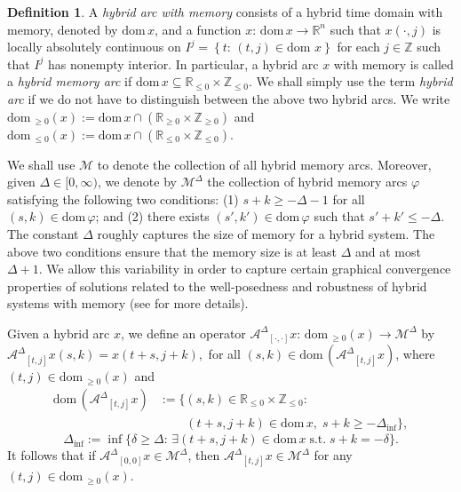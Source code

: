 \documentclass[journal,final,twocolumn]{IEEEtran}
\theoremstyle{definition}
\newtheorem{defn}{Definition}
\begin{document}
\begin{defn}
A \emph{hybrid arc with memory} consists of a hybrid time domain with memory, denoted by ${\text{dom}\,} x$, and a function $x:\,{\text{dom}\,} x{\rightarrow} {\mathbb R}^n$ such that $x(\cdot,j)$ is locally absolutely continuous on $I^{j}={\left\{{t:\,(t,j)\in{\text{dom}\,}\,x}\right\}}$ for each $j\in{\mathbb{Z}}$ such that $I^{j}$ has nonempty interior. In particular, a hybrid arc $x$ with memory is called a \emph{hybrid memory arc} if ${\text{dom}\,} x{\subseteq}{\mathbb R}_{\le 0}\times{\mathbb{Z}}_{\le 0}$. We shall simply use the term \emph{hybrid arc} if we do not have to distinguish between the above two hybrid arcs. We write ${\text{dom}\,}_{\ge 0}(x):={\text{dom}\,} x\cap({\mathbb R}_{\ge 0}\times {\mathbb{Z}}_{\ge 0})$ and  ${\text{dom}\,}_{\le 0}(x):={\text{dom}\,} x\cap({\mathbb R}_{\le 0}\times {\mathbb{Z}}_{\le 0})$.
\end{defn}

We shall use ${\mathcal{M}}$ to denote the collection of all hybrid memory arcs. Moreover, given $\Delta\in[0,\infty)$, we denote by ${\mathcal{M}^{\Delta}}$ the collection of hybrid memory arcs ${\varphi}$ satisfying the following two conditions: (1) $s+k\ge -\Delta-1$ for all $(s,k)\in{\text{dom}\,}{\varphi}$; and (2) there exists $(s',k')\in {\text{dom}\,}{\varphi}$ such that $s'+k'\le-\Delta$. The constant $\Delta$ roughly captures the size of memory for a hybrid system. The above two conditions ensure that the memory size is at least $\Delta$ and at most $\Delta+1$. We allow this variability in order to capture certain graphical convergence properties of solutions related to the well-posedness and robustness of hybrid systems with memory (see \cite{liu2014hybrid-siam} for more details). 

Given a hybrid arc $x$, we define an operator ${\mathcal{A}^{\Delta}}_{[\cdot,\cdot]}x:\,{\text{dom}\,}_{\ge 0}(x){\rightarrow} {\mathcal{M}^{\Delta}}$ by
$
{\mathcal{A}^{\Delta}}_{[t,j]}x(s,k)=x(t+s,j+k),
$
for all $(s,k)\in{\text{dom}\,} ({\mathcal{A}^{\Delta}}_{[t,j]}x)$, where $(t,j)\in{\text{dom}\,}_{\ge 0}(x)$ and
\begin{align*}
{\text{dom}\,} ({\mathcal{A}^{\Delta}}_{[t,j]} x)&:=\Big\{(s,k)\in {\mathbb R}_{\le 0}\times {\mathbb{Z}}_{\le 0}:\\
&\qquad\,(t+s,j+k)\in{\text{dom}\,} x,\;s+k\ge -\Delta_{\inf}\Big\},
\end{align*}
$$
\Delta_{\inf}:=\inf\Big\{\delta\ge\Delta:\,\exists(t+s,j+k)\in{\text{dom}\,} x\;\text{s.t.}\;   s+k=-\delta\Big\}.
$$
It follows that if ${\mathcal{A}^{\Delta}}_{[0,0]}x\in {\mathcal{M}^{\Delta}}$, then ${\mathcal{A}^{\Delta}}_{[t,j]}x\in {\mathcal{M}^{\Delta}}$ for any $(t,j)\in {\text{dom}\,}_{\ge 0}(x)$.
\end{document}
